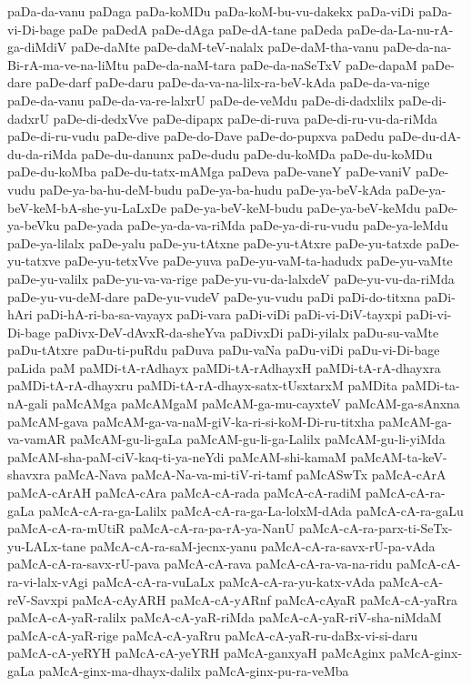 {paDa-da-vanu
paDaga
paDa-koMDu
paDa-koM-bu-vu-dakekx
paDa-viDi
paDa-vi-Di-bage
paDe
paDedA
paDe-dAga
paDe-dA-tane
paDeda
paDe-da-La-nu-rA-ga-diMdiV
paDe-daMte
paDe-daM-teV-nalalx
paDe-daM-tha-vanu
paDe-da-na-Bi-rA-ma-ve-na-liMtu
paDe-da-naM-tara
paDe-da-naSeTxV
paDe-dapaM
paDe-dare
paDe-darf
paDe-daru
paDe-da-va-na-lilx-ra-beV-kAda
paDe-da-va-nige
paDe-da-vanu
paDe-da-va-re-lalxrU
paDe-de-veMdu
paDe-di-dadxlilx
paDe-di-dadxrU
paDe-di-dedxVve
paDe-dipapx
paDe-di-ruva
paDe-di-ru-vu-da-riMda
paDe-di-ru-vudu
paDe-dive
paDe-do-Dave
paDe-do-pupxva
paDedu
paDe-du-dA-du-da-riMda
paDe-du-danunx
paDe-dudu
paDe-du-koMDa
paDe-du-koMDu
paDe-du-koMba
paDe-du-tatx-mAMga
paDeva
paDe-vaneY
paDe-vaniV
paDe-vudu
paDe-ya-ba-hu-deM-budu
paDe-ya-ba-hudu
paDe-ya-beV-kAda
paDe-ya-beV-keM-bA-she-yu-LaLxDe
paDe-ya-beV-keM-budu
paDe-ya-beV-keMdu
paDe-ya-beVku
paDe-yada
paDe-ya-da-va-riMda
paDe-ya-di-ru-vudu
paDe-ya-leMdu
paDe-ya-lilalx
paDe-yalu
paDe-yu-tAtxne
paDe-yu-tAtxre
paDe-yu-tatxde
paDe-yu-tatxve
paDe-yu-tetxVve
paDe-yuva
paDe-yu-vaM-ta-hadudx
paDe-yu-vaMte
paDe-yu-valilx
paDe-yu-va-va-rige
paDe-yu-vu-da-lalxdeV
paDe-yu-vu-da-riMda
paDe-yu-vu-deM-dare
paDe-yu-vudeV
paDe-yu-vudu
paDi
paDi-do-titxna
paDi-hAri
paDi-hA-ri-ba-sa-vayayx
paDi-vara
paDi-viDi
paDi-vi-DiV-tayxpi
paDi-vi-Di-bage
paDivx-DeV-dAvxR-da-sheYva
paDivxDi
paDi-yilalx
paDu-su-vaMte
paDu-tAtxre
paDu-ti-puRdu
paDuva
paDu-vaNa
paDu-viDi
paDu-vi-Di-bage
paLida
paM
paMDi-tA-rAdhayx
paMDi-tA-rAdhayxH
paMDi-tA-rA-dhayxra
paMDi-tA-rA-dhayxru
paMDi-tA-rA-dhayx-satx-tUsxtarxM
paMDita
paMDi-ta-nA-gali
paMcAMga
paMcAMgaM
paMcAM-ga-mu-cayxteV
paMcAM-ga-sAnxna
paMcAM-gava
paMcAM-ga-va-naM-giV-ka-ri-si-koM-Di-ru-titxha
paMcAM-ga-va-vamAR
paMcAM-gu-li-gaLa
paMcAM-gu-li-ga-Lalilx
paMcAM-gu-li-yiMda
paMcAM-sha-paM-ciV-kaq-ti-ya-neYdi
paMcAM-shi-kamaM
paMcAM-ta-keV-shavxra
paMcA-Nava
paMcA-Na-va-mi-tiV-ri-tamf
paMcASwTx
paMcA-cArA
paMcA-cArAH
paMcA-cAra
paMcA-cA-rada
paMcA-cA-radiM
paMcA-cA-ra-gaLa
paMcA-cA-ra-ga-Lalilx
paMcA-cA-ra-ga-La-lolxM-dAda
paMcA-cA-ra-gaLu
paMcA-cA-ra-mUtiR
paMcA-cA-ra-pa-rA-ya-NanU
paMcA-cA-ra-parx-ti-SeTx-yu-LALx-tane
paMcA-cA-ra-saM-jecnx-yanu
paMcA-cA-ra-savx-rU-pa-vAda
paMcA-cA-ra-savx-rU-pava
paMcA-cA-rava
paMcA-cA-ra-va-na-ridu
paMcA-cA-ra-vi-lalx-vAgi
paMcA-cA-ra-vuLaLx
paMcA-cA-ra-yu-katx-vAda
paMcA-cA-reV-Savxpi
paMcA-cAyARH
paMcA-cA-yARnf
paMcA-cAyaR
paMcA-cA-yaRra
paMcA-cA-yaR-ralilx
paMcA-cA-yaR-riMda
paMcA-cA-yaR-riV-sha-niMdaM
paMcA-cA-yaR-rige
paMcA-cA-yaRru
paMcA-cA-yaR-ru-daBx-vi-si-daru
paMcA-cA-yeRYH
paMcA-cA-yeYRH
paMcA-ganxyaH
paMcAginx
paMcA-ginx-gaLa
paMcA-ginx-ma-dhayx-dalilx
paMcA-ginx-pu-ra-veMba
}
